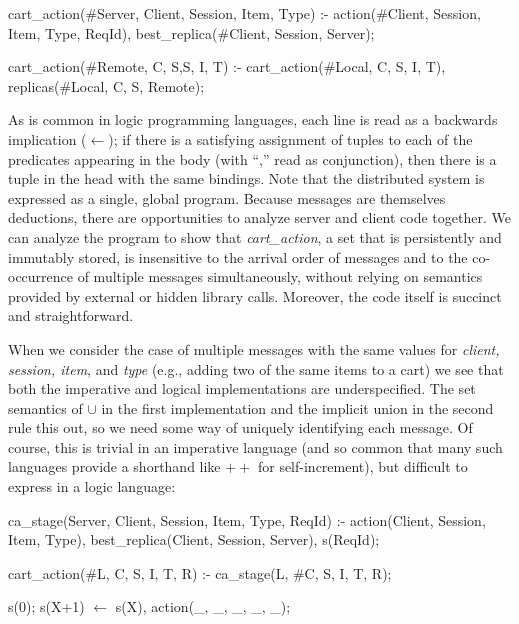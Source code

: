 \begin{Dedalus}
cart\_action(#Server, Client, Session, Item, Type) :-
  action(#Client, Session, Item, Type, ReqId),
  best_replica(#Client, Session, Server);

cart\_action(#Remote, C, S,S, I, T) :-
  cart\_action(#Local, C, S, I, T),
  replicas(#Local, C, S, Remote);
\end{Dedalus}

As is common in logic programming languages, each line is read as a backwards
implication ($\leftarrow$); if there is a satisfying assignment of tuples to each of
the predicates appearing in the body (with ``,'' read as conjunction), 
then there is a tuple in the head with the same bindings.
Note that the distributed system is expressed as a single, global program.
Because messages are themselves deductions, there are opportunities to 
analyze server and client code together.  We can analyze the program to 
show that {\em cart\_action}, a set that is persistently and immutably
stored, is insensitive to the arrival order of messages 
and to the co-occurrence of multiple messages simultaneously, without relying
on semantics provided by external or hidden library calls. Moreover, the code 
itself is succinct and straightforward. 




When we consider the case of multiple messages with the same values for
{\em client, session, item}, and {\em type} (e.g., adding two of the same items to a cart)
we see that both the imperative and logical implementations are underspecified.
The set semantics of $\cup$ in the first implementation and the implicit union 
in the second rule this out, so we need some way of uniquely identifying each message.
Of course, this is trivial in an imperative language (and so common that many such languages
provide a shorthand like $++$ for self-increment), but difficult to express in a logic language:

\begin{Dedalus}
ca_stage(Server, Client, Session, Item, Type, ReqId) :-
  action(Client, Session, Item, Type),
  best_replica(Client, Session, Server),
  s(ReqId);

cart_action(#L, C, S, I, T, R) :-
  ca_stage(L, #C, S, I, T, R);

s(0);
s(X+1) \(\leftarrow\)  s(X), action(_, _, _, _, _);
\end{Dedalus}


